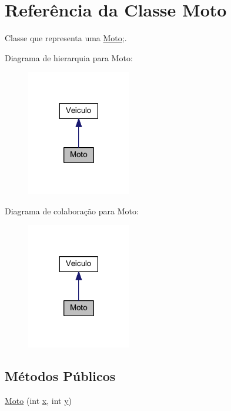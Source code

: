 \hypertarget{class_moto}{}\section{Referência da Classe Moto}
\label{class_moto}


Classe que representa uma \mbox{\hyperlink{class_moto}{Moto}};.  




Diagrama de hierarquia para Moto\+:
\nopagebreak
\begin{figure}[H]
\begin{center}
\leavevmode
\includegraphics[width=129pt]{class_moto__inherit__graph}
\end{center}
\end{figure}


Diagrama de colaboração para Moto\+:
\nopagebreak
\begin{figure}[H]
\begin{center}
\leavevmode
\includegraphics[width=129pt]{class_moto__coll__graph}
\end{center}
\end{figure}
\subsection*{Métodos Públicos}
\begin{DoxyCompactItemize}
\item 
\mbox{\hyperlink{class_moto_a803d5eb919bb5e4c6f30e5455cf28097}{Moto}} (int \mbox{\hyperlink{class_veiculo_a069917a284297fe5b385258b2afd9ad6}{x}}, int \mbox{\hyperlink{class_veiculo_af25046404db7c2786c0d9e468bb1fb64}{y}})
\end{DoxyCompactItemize}
